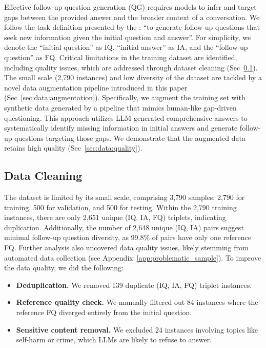 Effective follow-up question generation (QG) requires models to infer and target gaps between the provided answer and the broader context of a conversation. We follow the task definition presented by the \fd{} \cite{meng-etal-2023-followupqg}: ``to generate follow-up questions that seek new information given the initial question and answer''. For simplicity, we denote the ``initial question'' as IQ, ``initial answer'' as IA, and the ``follow-up question'' as FQ. Critical limitations in the training dataset are identified, including quality issues, which are addressed through dataset cleaning (Sec~\ref{sec:data:cleaning}). The small scale (2,790 instances) and low diversity of the dataset are tackled by a novel data augmentation pipeline introduced in this paper (Sec~\ref{sec:data:augmentation}). Specifically, we augment the \fd{} training set with synthetic data generated by a pipeline that mimics human-like gap-driven questioning. This approach utilizes LLM-generated comprehensive answers to systematically identify missing information in initial answers and generate follow-up questions targeting those gaps. We demonstrate that the augmented data retains high quality (Sec~\ref{sec:data:quality}).

\subsection{Data Cleaning}
\label{sec:data:cleaning}

The \fd{} dataset is limited by its small scale, comprising 3,790 samples: 2,790 for training, 500 for validation, and 500 for testing. Within the 2,790 training instances, there are only 2,651 unique (IQ, IA, FQ) triplets, indicating duplication. Additionally, the number of 2,648 unique (IQ, IA) pairs suggest minimal follow-up question diversity, as 99.8\% of pairs have only one reference FQ. Further analysis also uncovered data quality issues, likely stemming from automated data collection (see Appendix~\ref{app:problematic_sample}). To improve the data quality, we did the following:

\begin{itemize}[leftmargin=10pt]
    \item \textbf{Deduplication.} We removed 139 duplicate (IQ, IA, FQ) triplet instances.
    \item \textbf{Reference quality check.} We manually filtered out 84 instances where the reference FQ diverged entirely from the initial question. 
    \item \textbf{Sensitive content removal.} We excluded 24 instances involving topics like self-harm or crime, which LLMs are likely to refuse to answer.
\end{itemize}

